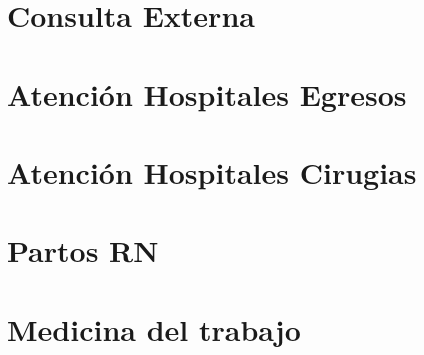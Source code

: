 \documentclass[
]{book}
\begin{document}
\hypertarget{consulta-externa}{%
\chapter{Consulta Externa}\label{consulta-externa}}

\hypertarget{atenciuxf3n-hospitales-egresos}{%
\chapter{Atención Hospitales Egresos}\label{atenciuxf3n-hospitales-egresos}}

\hypertarget{atenciuxf3n-hospitales-cirugias}{%
\chapter{Atención Hospitales Cirugias}\label{atenciuxf3n-hospitales-cirugias}}

\hypertarget{partos-rn}{%
\chapter{Partos RN}\label{partos-rn}}

\hypertarget{medicina-del-trabajo}{%
\chapter{Medicina del trabajo}\label{medicina-del-trabajo}}

  
\end{document}
